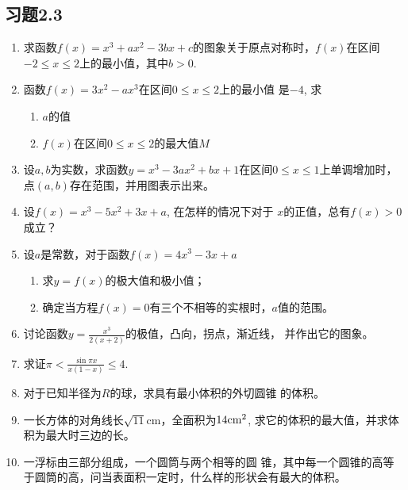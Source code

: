 \subsection*{习题2.3}
\begin{enumerate}
    \item 求函数$f(x)=x^3+ax^2-3bx+c$的图象关于原点对称时，$f(x)$在区间$-2\le x\le 2$上的最小值，其中$b>0$.
    
    \item 函数$f(x)=3x^2-ax^3$在区间$0\le x\le 2$上的最小值
    是$-4$, 求
\begin{enumerate}
    \item $a$的值
    \item $f(x)$在区间$0\le x\le 2$的最大值$M$
\end{enumerate}
\item 设$a,b$为实数，求函数$y=x^3-3ax^2+bx+1$在区间$0\le x\le 1$上单调增加时，点$(a,b)$存在范围，并用图表示出来。

\item 设$f(x)=x^3-5x^2+3x+a$, 在怎样的情况下对于
$x$的正值，总有$f(x)>0$成立？
\item 设$a$是常数，对于函数$f(x)=4x^3-3x+a$
\begin{enumerate}
    \item 求$y=f(x)$的极大值和极小值；
    \item 确定当方程$f(x)=0$有三个不相等的实根时，$a$值的范围。
\end{enumerate}

\item 讨论函数$y=\frac{x^3}{2 (x+2)}$的极值，凸向，拐点，渐近线，
并作出它的图象。

\item 求证$\pi<\frac{\sin\pi x}{x(1-x)}\le 4$.
\item 对于已知半径为$R$的球，求具有最小体积的外切圆锥
的体积。
\item 一长方体的对角线长$\sqrt{11}$cm，全面积为$14{\rm cm}^2$, 求它的体积的最大值，并求体积为最大时三边的长。
\item 一浮标由三部分组成，一个圆筒与两个相等的圆
锥，其中每一个圆锥的高等于圆筒的高，问当表面积一定时，什么样的形状会有最大的体积。
\end{enumerate}     


